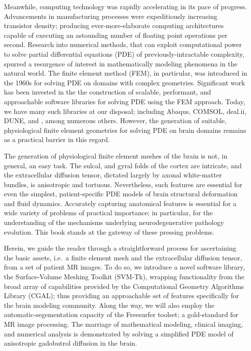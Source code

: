 Meanwhile, computing technology was rapidly accelerating in its pace of progress. 
Advancements in manufacturing processes were expeditiously increasing transistor 
density; producing ever-more-elaborate computing architectures capable of executing 
an astounding number of floating point operations per second.  Research into 
numerical methods, that can exploit computational power to solve partial 
differential equations (PDE) of previously-intractable complexity, spurred a 
resurgence of interest in mathematically modeling phenomena in the natural world.  The finite 
element method (FEM), in particular, was introduced in the 1960s for solving 
PDE on domains with complex geometries.  Significant work has been invested in 
the the construction of scalable, performant, and approachable software libraries 
for solving PDE using the FEM approach.  Today, we have many such libraries at 
our disposal; including Abaqus, COMSOL, deal.ii, DUNE, and {\fenics}, among numerous 
others. However, the generation of suitable, physiological finite element 
geometries for solving PDE on brain domains remains as a practical barrier in 
this regard.

The generation of physiological finite element meshes of the brain is not, in 
general, an easy task.  The sulcal, and gyral folds of the cortex are intricate, 
and the extracellular diffusion tensor, dictated largely by axonal white-matter 
bundles, is anisotropic and tortuous. Nevertheless, such features are 
essential for even the simplest, patient-specific PDE models of brain 
structural deformation and fluid dynamics.  Accurately capturing anatomical 
features is essential for a wide variety of problems of practical importance; 
in particular, for the understanding of the mechanisms underlying neurodegenerative 
pathology evolution.  This book stands at the gateway of these pressing problems.  


Herein, we guide the reader through a straightforward process for ascertaining 
the basic assets, i.e.~a finite element mesh and the extracellular diffusion 
tensor, from a set of patient MR images.  To do so, we introduce a novel software library, the 
Surface-Volume Meshing Toolkit (SVM-Tk), wrapping functionality from the broad 
array of capabilities provided by the Computational Geometry Algorithms Library 
(CGAL); thus providing an approachable set of features specifically for 
the brain modeling community.  Along the way, we will also employ the 
automatic-segementation capacity of the Freesurfer toolset; a gold-standard 
for MR image processing.  The marriage of mathematical modeling, clinical imaging, 
and numerical analysis is demonstrated by solving a simplified PDE model of 
anisotropic gadobutrol diffusion in the brain. 

